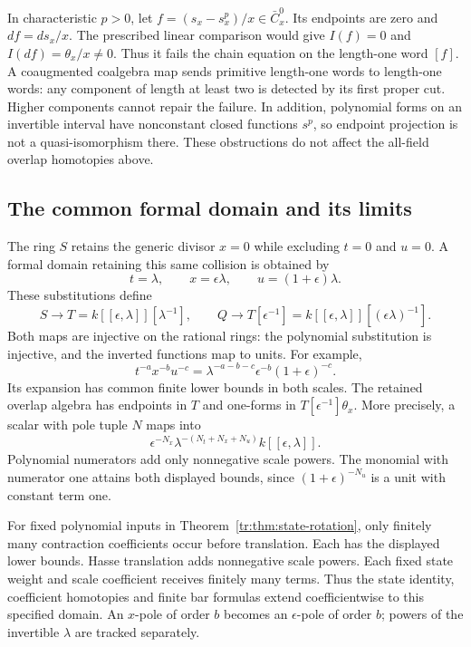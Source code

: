 In characteristic \(p>0\), let
\(f=(s_x-s_x^p)/x\in\bar C_x^0\).  Its endpoints are
zero and \(df=ds_x/x\).  The prescribed linear comparison
would give \(I(f)=0\) and \(I(df)=\theta_x/x\ne0\).
Thus it fails the chain equation on the length-one word \([f]\).
A coaugmented coalgebra map sends primitive length-one words to
length-one words: any component of length at least two is detected
by its first proper cut.  Higher components cannot repair the
failure.  In addition, polynomial forms on an invertible interval
have nonconstant closed functions \(s^p\), so endpoint
projection is not a quasi-isomorphism there.  These obstructions
do not affect the all-field overlap homotopies above.

\subsection{The common formal domain and its limits}

The ring \(S\) retains the generic divisor \(x=0\) while
excluding \(t=0\) and \(u=0\).  A formal domain retaining
this same collision is obtained by
\[
 t=\lambda,\qquad x=\epsilon\lambda,\qquad
 u=(1+\epsilon)\lambda.
\]
These substitutions define
\[
 S\longrightarrow T=k[[\epsilon,\lambda]][\lambda^{-1}],
 \qquad
 Q\longrightarrow T[\epsilon^{-1}]
       =k[[\epsilon,\lambda]][(\epsilon\lambda)^{-1}].
\]
Both maps are injective on the rational rings: the polynomial
substitution is injective, and the inverted functions map to units.
For example,
\[
 t^{-a}x^{-b}u^{-c}
 =\lambda^{-a-b-c}\epsilon^{-b}(1+\epsilon)^{-c}.
\]
Its expansion has common finite lower bounds in both scales.
The retained overlap algebra has endpoints in \(T\) and
one-forms in \(T[\epsilon^{-1}]\theta_x\).
More precisely, a scalar with pole tuple \(N\) maps into
\[
 \epsilon^{-N_x}\lambda^{-(N_t+N_x+N_u)}k[[\epsilon,\lambda]].
\]
Polynomial numerators add only nonnegative scale powers.  The
monomial with numerator one attains both displayed bounds, since
\((1+\epsilon)^{-N_u}\) is a unit with constant term one.

For fixed polynomial inputs in
Theorem~\ref{tr:thm:state-rotation}, only finitely many contraction
coefficients occur before translation.  Each has the displayed
lower bounds.  Hasse translation adds nonnegative scale powers.
Each fixed state weight and scale coefficient receives finitely many
terms.  Thus the state identity, coefficient homotopies and finite
bar formulas extend coefficientwise to this specified domain.
An \(x\)-pole of order \(b\) becomes an \(\epsilon\)-pole
of order \(b\); powers of the invertible \(\lambda\) are
tracked separately.

